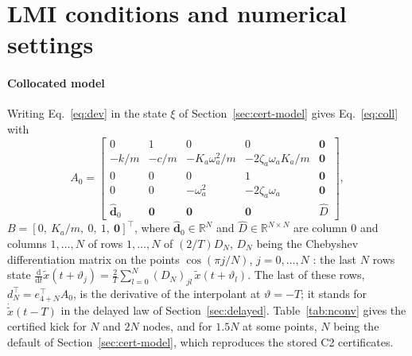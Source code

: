\section{LMI conditions and numerical settings}\label{app:lmi}

\paragraph{Collocated model}
Writing Eq.~\eqref{eq:dev} in the state $\xi$ of Section~\ref{sec:cert-model} gives Eq.~\eqref{eq:coll} with
\begin{equation}\label{eq:app-A0}
A_0=\begin{bmatrix}
0&1&0&0&\bm 0\\
-k/m&-c/m&-K_a\omega_a^2/m&-2\zeta_a\omega_aK_a/m&\bm 0\\
0&0&0&1&\bm 0\\
0&0&-\omega_a^2&-2\zeta_a\omega_a&\bm 0\\
\hat{\bm d}_0&\bm 0&\bm 0&\bm 0&\hat D
\end{bmatrix},
\end{equation}
$B=[0,\ K_a/m,\ 0,\ 1,\ \bm 0]^\top$, where $\hat{\bm d}_0\in\mathbb R^N$ and $\hat D\in\mathbb R^{N\times N}$ are column 0 and columns $1,\dots,N$ of rows $1,\dots,N$ of $(2/T)D_N$, $D_N$ being the Chebyshev differentiation matrix on the points $\cos(\pi j/N)$, $j=0,\dots,N$ \citep{trefethen2000spectral}: the last $N$ rows state $\tfrac{\mathrm d}{\mathrm dt}\tilde x(t+\vartheta_j)=\tfrac2T\sum_{l=0}^{N}(D_N)_{jl}\,\tilde x(t+\vartheta_l)$. The last of these rows, $d_N^\top=e_{4+N}^\top A_0$, is the derivative of the interpolant at $\vartheta=-T$; it stands for $\dot{\tilde x}(t-T)$ in the delayed law of Section~\ref{sec:delayed}. Table~\ref{tab:nconv} gives the certified kick for $N$ and $2N$ nodes, and for $1.5N$ at some points, $N$ being the default of Section~\ref{sec:cert-model}, which reproduces the stored C2 certificates.

